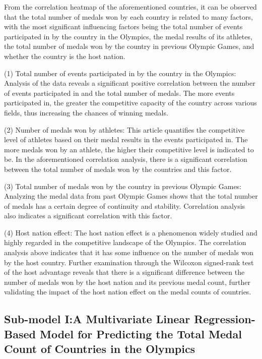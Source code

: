 \documentclass{mcmthesis}
\begin{document}
From the correlation heatmap of the aforementioned countries, it can be observed that the total number of medals won by each country is related to many factors, with the most significant influencing factors being the total number of events participated in by the country in the Olympics, the medal results of its athletes, the total number of medals won by the country in previous Olympic Games, and whether the country is the host nation.

(1) Total number of events participated in by the country in the Olympics: Analysis of the data reveals a significant positive correlation between the number of events participated in and the total number of medals. The more events participated in, the greater the competitive capacity of the country across various fields, thus increasing the chances of winning medals.

(2) Number of medals won by athletes: This article quantifies the competitive level of athletes based on their medal results in the events participated in. The more medals won by an athlete, the higher their competitive level is indicated to be. In the aforementioned correlation analysis, there is a significant correlation between the total number of medals won by the countries and this factor.

(3) Total number of medals won by the country in previous Olympic Games: Analyzing the medal data from past Olympic Games shows that the total number of medals has a certain degree of continuity and stability. Correlation analysis also indicates a significant correlation with this factor.

(4) Host nation effect: The host nation effect is a phenomenon widely studied and highly regarded in the competitive landscape of the Olympics. The correlation analysis above indicates that it has some influence on the number of medals won by the host country. Further examination through the Wilcoxon signed-rank test of the host advantage reveals that there is a significant difference between the number of medals won by the host nation and its previous medal count, further validating the impact of the host nation effect on the medal counts of countries.

\subsection{Sub-model I:A Multivariate Linear Regression-Based Model for Predicting the Total Medal Count of Countries in the Olympics}
\end{document}
